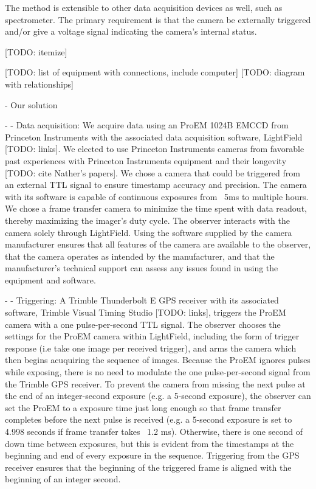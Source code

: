 \documentclass[preprint2]{aastex}
\begin{document}
The method is extensible to other data acquisition devices as well, such as spectrometer. The primary requirement is that the camera be externally triggered and/or give a voltage signal indicating the camera's internal status. 

[TODO: itemize]

[TODO: list of equipment with connections, include computer] [TODO: diagram with relationships]

- Our solution

- - Data acquisition: We acquire data using an ProEM 1024B EMCCD from Princeton Instruments with the associated data acquisition software, LightField [TODO: links]. We elected to use Princeton Instruments cameras from favorable past experiences with Princeton Instruments equipment and their longevity [TODO: cite Nather's papers]. We chose a camera that could be triggered from an external TTL signal to ensure timestamp accuracy and precision. The camera with its software is capable of continuous exposures from ~5ms to multiple hours. We chose a frame transfer camera to minimize the time spent with data readout, thereby maximizing the imager's duty cycle. The observer interacts with the camera solely through LightField. Using the software supplied by the camera manufacturer ensures that all features of the camera are available to the observer, that the camera operates as intended by the manufacturer, and that the manufacturer's technical support can assess any issues found in using the equipment and software.

- - Triggering: A Trimble Thunderbolt E GPS receiver with its associated software, Trimble Visual Timing Studio [TODO: links], triggers the ProEM camera with a one pulse-per-second TTL signal. The observer chooses the settings for the ProEM camera within LightField, including the form of trigger response (i.e take one image per received trigger), and arms the camera which then begins acuquiring the sequence of images. Because the ProEM ignores pulses while exposing, there is no need to modulate the one pulse-per-second signal from the Trimble GPS receiver. To prevent the camera from missing the next pulse at the end of an integer-second exposure (e.g. a 5-second exposure), the observer can set the ProEM to a exposure time just long enough so that frame transfer completes before the next pulse is received (e.g. a 5-second exposure is set to 4.998 seconds if frame transfer takes ~1.2 ms). Otherwise, there is one second of down time between exposures, but this is evident from the timestamps at the beginning and end of every exposure in the sequence. Triggering from the GPS receiver ensures that the beginning of the triggered frame is aligned with the beginning of an integer second.
\end{document}
